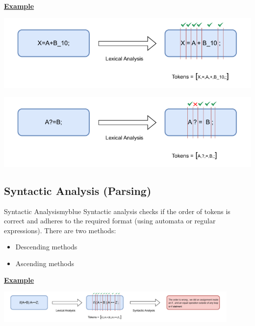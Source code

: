 \newpage
\underline{\textbf{Example}}

\begin{center}
    \includegraphics{Chapters/Examples/Intro/ex1.drawio.pdf}
\end{center}

\vspace{0.25cm}
\begin{center}
    \includegraphics{Chapters/Examples/Intro/ex2.drawio.pdf}
\end{center}

\vspace{0.35cm}


\subsection{Syntactic Analysis (Parsing)}
\begin{prettyBox}{Syntactic Analysis}{myblue}
Syntactic analysis checks if the order of tokens is correct and adheres to the required format (using automata or regular expressions).  
There are two methods:  
\begin{itemize}
    \item Descending methods  
    \item Ascending methods  
\end{itemize}
\end{prettyBox}

\vspace{0.95cm}
\underline{\textbf{Example}}

\vspace{0.35cm}
\begin{center}
    \includegraphics[height=0.17\textheight,width=0.9\textwidth]{Chapters/Examples/Intro/ex3.drawio.pdf}
\end{center}

